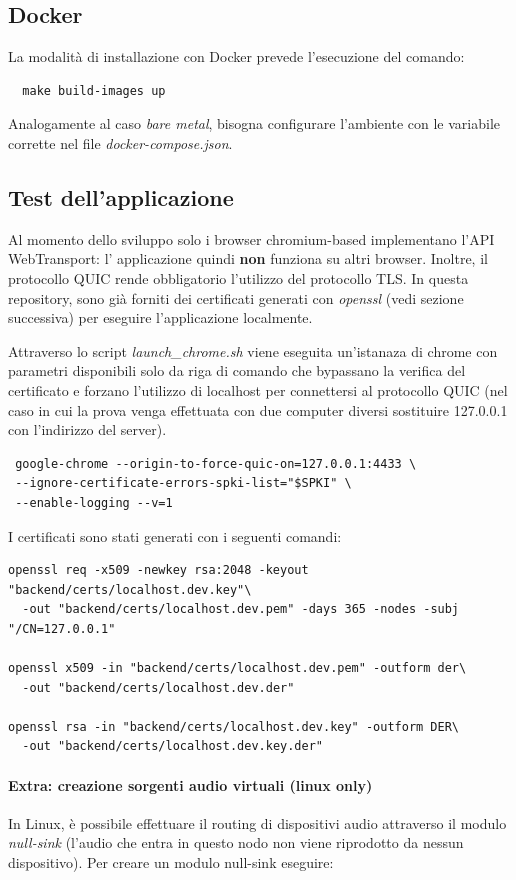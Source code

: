 \documentclass{article}
\begin{document}
\subsection{Docker}
La modalità di installazione con Docker prevede l'esecuzione del comando:
\begin{verbatim}
  make build-images up 
\end{verbatim}
Analogamente al caso \textit{bare metal}, bisogna configurare l'ambiente con le variabile 
corrette nel file \textit{docker-compose.json}.

\subsection{Test dell'applicazione} 
Al momento dello sviluppo solo i browser chromium-based implementano l'API WebTransport: l'
applicazione quindi \textbf{non} funziona su altri browser. Inoltre, il protocollo QUIC rende
obbligatorio l'utilizzo del protocollo TLS. In questa repository, sono già forniti dei
certificati generati con \textit{openssl} (vedi sezione successiva) per eseguire l'applicazione
localmente.

Attraverso lo script \textit{launch\_chrome.sh} viene eseguita un'istanaza di chrome con parametri
disponibili solo da riga di comando che bypassano la verifica del certificato e forzano
l'utilizzo di localhost per connettersi al protocollo QUIC (nel caso in cui la prova venga 
effettuata con due computer diversi sostituire 127.0.0.1 con l'indirizzo del server). 
\begin{verbatim}
 google-chrome --origin-to-force-quic-on=127.0.0.1:4433 \ 
 --ignore-certificate-errors-spki-list="$SPKI" \ 
 --enable-logging --v=1
\end{verbatim}

I certificati sono stati generati con i seguenti comandi:
\begin{verbatim}
openssl req -x509 -newkey rsa:2048 -keyout "backend/certs/localhost.dev.key"\ 
  -out "backend/certs/localhost.dev.pem" -days 365 -nodes -subj "/CN=127.0.0.1"

openssl x509 -in "backend/certs/localhost.dev.pem" -outform der\
  -out "backend/certs/localhost.dev.der"

openssl rsa -in "backend/certs/localhost.dev.key" -outform DER\ 
  -out "backend/certs/localhost.dev.key.der"
\end{verbatim}

\paragraph{Extra: creazione sorgenti audio virtuali (linux only)}
In Linux, è possibile effettuare il routing di dispositivi audio attraverso il modulo \textit{null-sink}
(l'audio che entra in questo nodo non viene riprodotto da nessun dispositivo). Per creare 
un modulo null-sink eseguire:
\end{document}
